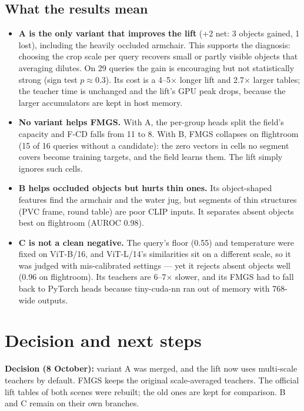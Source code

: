 \documentclass[11pt,a4paper]{article}
\begin{document}
\subsection{What the results mean}
\begin{itemize}
  \item \textbf{A is the only variant that improves the lift} (+2 net: 3 objects gained, 1 lost), including the
        heavily occluded armchair. This supports the diagnosis: choosing the crop scale per query recovers small
        or partly visible objects that averaging dilutes. On 29 queries the gain is encouraging but not
        statistically strong (sign test $p\approx0.3$). Its cost is a 4--5$\times$ longer lift and 2.7$\times$
        larger tables; the teacher time is unchanged and the lift's GPU peak drops, because the larger
        accumulators are kept in host memory.
  \item \textbf{No variant helps FMGS.} With A, the per-group heads split the field's capacity and F-CD falls from
        11 to 8. With B, FMGS collapses on flightroom (15 of 16 queries without a candidate): the zero vectors in
        cells no segment covers become training targets, and the field learns them. The lift simply ignores
        such cells.
  \item \textbf{B helps occluded objects but hurts thin ones.} Its object-shaped features find the armchair and the
        water jug, but segments of thin structures (PVC frame, round table) are poor CLIP inputs. It separates
        absent objects best on flightroom (AUROC 0.98).
  \item \textbf{C is not a clean negative.} The query's floor (0.55) and temperature were fixed on ViT-B/16, and
        ViT-L/14's similarities sit on a different scale, so it was judged with mis-calibrated settings --- yet it
        rejects absent objects well (0.96 on flightroom). Its teachers are 6--7$\times$ slower, and its FMGS had to
        fall back to PyTorch heads because tiny-cuda-nn ran out of memory with 768-wide outputs.
\end{itemize}

\section{Decision and next steps}

\textbf{Decision (8 October):} variant A was merged, and the lift now uses multi-scale teachers by default. FMGS
keeps the original scale-averaged teachers. The official lift tables of both scenes were rebuilt; the old ones
are kept for comparison. B and C remain on their own branches.
\end{document}

